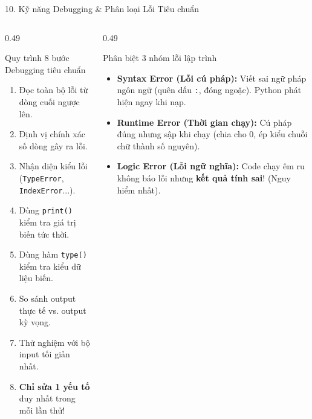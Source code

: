 \documentclass[aspectratio=169, 10pt]{beamer}
\begin{document}
\begin{frame}{10. Kỹ năng Debugging \& Phân loại Lỗi Tiêu chuẩn}
  \begin{columns}[T]
    \begin{column}{0.49\textwidth}
      \begin{cbox}[primaryblue]{Quy trình 8 bước Debugging tiêu chuẩn}
        \scriptsize
        \begin{enumerate}\setlength{\itemsep}{1.5pt}
          \item Đọc toàn bộ lỗi từ dòng cuối ngược lên.
          \item Định vị chính xác số dòng gây ra lỗi.
          \item Nhận diện kiểu lỗi (\texttt{TypeError}, \texttt{IndexError}...).
          \item Dùng \texttt{print()} kiểm tra giá trị biến tức thời.
          \item Dùng hàm \texttt{type()} kiểm tra kiểu dữ liệu biến.
          \item So sánh output thực tế vs. output kỳ vọng.
          \item Thử nghiệm với bộ input tối giản nhất.
          \item \textbf{Chỉ sửa 1 yếu tố} duy nhất trong mỗi lần thử!
        \end{enumerate}
      \end{cbox}
    \end{column}
    \begin{column}{0.49\textwidth}
      \begin{cbox}[accentorange]{Phân biệt 3 nhóm lỗi lập trình}
        \footnotesize
        \begin{itemize}\setlength{\itemsep}{3pt}
          \item \textbf{Syntax Error (Lỗi cú pháp):} Viết sai ngữ pháp ngôn ngữ (quên dấu \texttt{:}, đóng ngoặc). Python phát hiện ngay khi nạp.
          \item \textbf{Runtime Error (Thời gian chạy):} Cú pháp đúng nhưng sập khi chạy (chia cho 0, ép kiểu chuỗi chữ thành số nguyên).
          \item \textbf{Logic Error (Lỗi ngữ nghĩa):} Code chạy êm ru không báo lỗi nhưng \textbf{kết quả tính sai}! (Nguy hiểm nhất).
        \end{itemize}
      \end{cbox}
    \end{column}
  \end{columns}
\end{frame}
\end{document}
